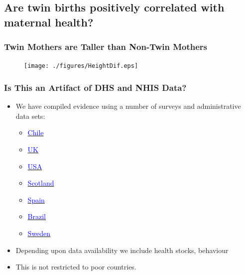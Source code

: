 \documentclass[9pt,letterpaper,subeqn]{beamer}
\begin{document}
\subsection{Are twin births positively correlated with maternal health?}

\begin{frame}[label=HealthTwin]
\frametitle{Twin Mothers are Taller than Non-Twin Mothers}

\begin{figure}[htpb!]
\centering
  \texttt{[image: ./figures/HeightDif.eps]}
\end{figure}
\hyperlink{EducTwin}{}
\end{frame}


\frame{
\vspace{5mm}

}

\frame{
\vspace{5mm}

}


\begin{frame}[label=USA2]

\end{frame}

\begin{frame}[label=c]
  \frametitle{Is This an Artifact of DHS and NHIS Data?}
  \begin{itemize}
  \item We have compiled evidence using a number of surveys and administrative data sets:
    \begin{itemize}
    \item \hyperlink{Chile}{\textcolor{blue}{Chile}}
    \item \hyperlink{UK}{\textcolor{blue}{UK}}
    \item \hyperlink{USA1}{\textcolor{blue}{USA}} 
    \item \hyperlink{Scotland}{\textcolor{blue}{Scotland}}
    \item \hyperlink{Spain1}{\textcolor{blue}{Spain}}
    \item \hyperlink{Brazil}{\textcolor{blue}{Brazil}}
    \item \hyperlink{Sweden}{\textcolor{blue}{Sweden}}
    \end{itemize}
  \item Depending upon data availability we include health stocks, behaviour
  \item This is not restricted to poor countries.
  \end{itemize}
\end{frame}
\end{document}
